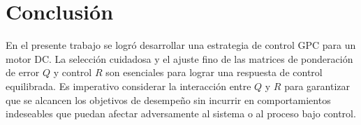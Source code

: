 \documentclass[journal]{IEEEtran}
\begin{document}
%




\section{Conclusión}
En el presente trabajo se logró desarrollar una estrategia de control GPC para un motor DC. La selección cuidadosa y el ajuste fino de las matrices de ponderación de error \( Q \) y control \( R \) son esenciales para lograr una respuesta de control equilibrada. Es imperativo considerar la interacción entre \( Q \) y \( R \) para garantizar que se alcancen los objetivos de desempeño sin incurrir en comportamientos indeseables que puedan afectar adversamente al sistema o al proceso bajo control.
\end{document}
